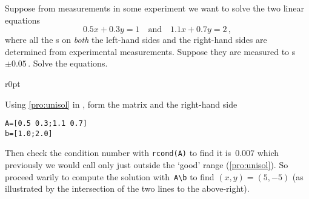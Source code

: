 \begin{example} \label{eg:2regu}
Suppose from measurements in some experiment we want to solve the two linear equations
\begin{equation*}
0.5x+0.3y=1\quad\text{and}\quad 1.1x+0.7y=2\,,
\end{equation*}
where all the s on \emph{both} the left-hand sides and the right-hand sides are determined from experimental measurements.
Suppose they are measured to s~\(\pm0.05\)\,.
Solve the equations.

\begin{wrapfigure}r{0pt}
\end{wrapfigure}
\begin{solution} 
Using \cref{pro:unisol} in \script, form the matrix and the right-hand side
\begin{verbatim}
A=[0.5 0.3;1.1 0.7]
b=[1.0;2.0]
\end{verbatim}
Then check the condition number with \verb|rcond(A)| to find it is~\(0.007\) which previously we would call only just outside the `good' range (\cref{pro:unisol}).
So proceed warily to compute the solution with~\verb|A\b| to find \((x,y)=(5,-5)\) (as illustrated by the intersection of the two lines to the above-right).



\end{solution}
\end{example}
